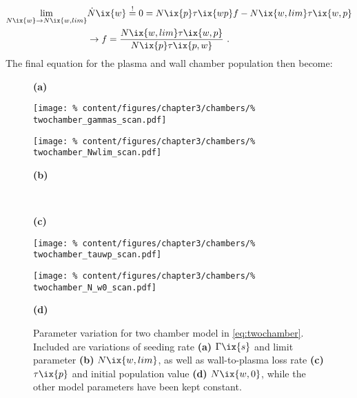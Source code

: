 %
            \begin{align}%
                \begin{split}\label{eq:twochamber_limes}%
                \displaystyle\lim_{N\ix{w}\to N\ix{w,lim}}&\dot{N}\ix{w}\overset{!}{=}0=N\ix{p}\tau\ix{wp}f-N\ix{w,lim}\tau\ix{w,p}\\%
                &\rightarrow f=\frac{N\ix{w,lim}\tau\ix{w,p}}{N\ix{p}\tau\ix{p,w}}\,\,.%
                \end{split}%
            \end{align}%
%
            The final equation for the plasma and wall chamber population then become:%
%
            \begin{figure}[t]%
                \parbox{0.02\linewidth}{%
                    \textbf{(a)}}%
                \quad%
                \parbox{0.42\linewidth}{%
                    \texttt{[image: \%
                        content/figures/chapter3/chambers/\%
                        twochamber\_gammas\_scan.pdf]}}%
                \quad%
                \parbox{0.42\linewidth}{%
                    \texttt{[image: \%
                        content/figures/chapter3/chambers/\%
                        twochamber\_Nwlim\_scan.pdf]}}%
                \quad%
                \parbox{0.02\linewidth}{%
                    \textbf{(b)}}%
                \,\\%
                \parbox{0.02\linewidth}{%
                    \textbf{(c)}}%
                \quad%
                \parbox{0.42\linewidth}{%
                    \texttt{[image: \%
                        content/figures/chapter3/chambers/\%
                        twochamber\_tauwp\_scan.pdf]}}%
                \quad%
                \parbox{0.42\linewidth}{%
                    \texttt{[image: \%
                        content/figures/chapter3/chambers/\%
                        twochamber\_N\_w0\_scan.pdf]}}%
                \quad%
                \parbox{0.02\linewidth}{%
                    \textbf{(d)}}%
                \caption{Parameter variation for two chamber model in \cref{eq:twochamber}. Included are variations of seeding rate \textbf{(a)} $\Gamma\ix{s}$ and limit parameter \textbf{(b)} $N\ix{w,lim}$, as well as wall-to-plasma loss rate \textbf{(c)} $\tau\ix{p}$ and initial population value \textbf{(d)} $N\ix{w,0}$, while the other model parameters have been kept constant.%
                }\label{fig:twochamber_scan}%
            \end{figure}%

